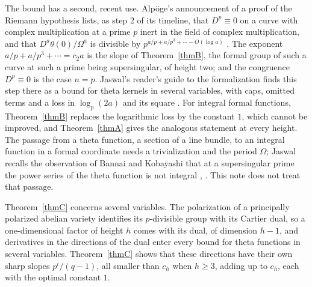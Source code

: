 \documentclass[11pt]{amsart}
\theoremstyle{definition}
\theoremstyle{remark}
\begin{document}
The bound has a second, recent use. Alp\"oge's announcement of a proof of the Riemann hypothesis lists, as step 2 of its timeline, that $D^p\equiv0$ on a curve with complex multiplication at a prime $p$ inert in the field of complex multiplication, and that $D^a\theta(0)/\Omega^a$ is divisible by $p^{a/p+a/p^3+\cdots-O(\log a)}$ \cite[p.~3]{Alpoge}. The exponent $a/p+a/p^3+\cdots=c_2a$ is the slope of Theorem~\ref{thmB}, the formal group of such a curve at such a prime being supersingular, of height two; and the congruence $D^p\equiv0$ is the case $n=p$. Jaswal's reader's guide to the formalization finds this step there as a bound for theta kernels in several variables, with caps, omitted terms and a loss in $\log_p(2a)$ and its square \cite[\S4.4, pp.~28--30]{Jaswal}. For integral formal functions, Theorem~\ref{thmB} replaces the logarithmic loss by the constant $1$, which cannot be improved, and Theorem~\ref{thmA} gives the analogous statement at every height. The passage from a theta function, a section of a line bundle, to an integral function in a formal coordinate needs a trivialization and the period $\Omega$; Jaswal recalls the observation of Bannai and Kobayashi that at a supersingular prime the power series of the theta function is not integral \cite[p.~30]{Jaswal}, \cite[\S4]{BK10}. This note does not treat that passage.

Theorem~\ref{thmC} concerns several variables. The polarization of a principally polarized abelian variety identifies its $p$-divisible group with its Cartier dual, so a one-dimensional factor of height $h$ comes with its dual, of dimension $h-1$, and derivatives in the directions of the dual enter every bound for theta functions in several variables. Theorem~\ref{thmC} shows that these directions have their own sharp slopes $p^i/(q-1)$, all smaller than $c_h$ when $h\ge3$, adding up to $c_h$, each with the optimal constant $1$.
\end{document}
